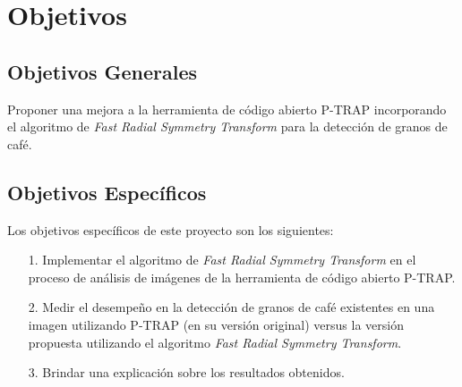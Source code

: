 \section{\textbf{Objetivos}}\label{objetivos}
\subsection{Objetivos Generales}\label{objetivosgenerales}
Proponer una mejora a la herramienta de c\'odigo abierto P-TRAP\cite{ptrap} incorporando el algoritmo de \textit{Fast Radial Symmetry Transform}\cite{loyzelinsky} para la detecci\'on de granos de caf\'e.
\subsection{Objetivos Espec\'ificos}\label{objetivosespecificos}
Los objetivos espec\'ificos de este proyecto son los siguientes:
\begin{itemize}
\item [1.] Implementar el algoritmo de \textit{Fast Radial Symmetry Transform}\cite{loyzelinsky} en el proceso de an\'alisis de im\'agenes de la herramienta de c\'odigo abierto P-TRAP\cite{ptrap}.
\item [2.] Medir el desempe\~no en la detecci\'on de granos de caf\'e existentes en una imagen utilizando P-TRAP\cite{ptrap} (en su versi\'on original) versus la versi\'on propuesta utilizando el algoritmo \textit{Fast Radial Symmetry Transform}\cite{loyzelinsky}. 
\item [3.] Brindar una explicaci\'on sobre los resultados obtenidos.
\end{itemize}